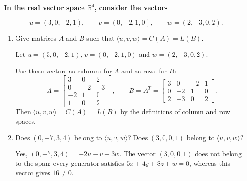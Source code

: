 \providecommand{\rank}{\operatorname{r}}
\providecommand{\RR}{\mathbb R}
\providecommand{\CC}{\mathbb C}
\providecommand{\KK}{\mathbb K}

\setcounter{enumi}{72}
\item {\bfseries\boldmath
In the real vector space $\RR^4$, consider the vectors
}

\[
u=(3,0,-2,1),\qquad v=(0,-2,1,0),\qquad w=(2,-3,0,2).
\]

\begin{enumerate}[label=\alph*)]

\item Give matrices $A$ and $B$ such that $\langle u,v,w\rangle=C(A)=L(B)$.

\begin{answer}
Let $u=(3,0,-2,1)$, $v=(0,-2,1,0)$ and $w=(2,-3,0,2)$.

Use these vectors as columns for $A$ and as rows for $B$:
\[
 A=\begin{bmatrix}3&0&2\\0&-2&-3\\-2&1&0\\1&0&2\end{bmatrix},\qquad
 B=A^T=\begin{bmatrix}3&0&-2&1\\0&-2&1&0\\2&-3&0&2\end{bmatrix}.
\]
Then $\langle u,v,w\rangle=C(A)=L(B)$ by the definitions of column and row spaces.
\end{answer}

\item Does $(0,-7,3,4)$ belong to $\langle u,v,w\rangle$? Does $(3,0,0,1)$ belong to $\langle u,v,w\rangle$?

\begin{answer}
Yes, $(0,-7,3,4)=-2u-v+3w$.
The vector $(3,0,0,1)$ does not belong to the span:
every generator satisfies $5x+4y+8z+w=0$, whereas this vector gives $16\ne0$.
\end{answer}
\end{enumerate}
